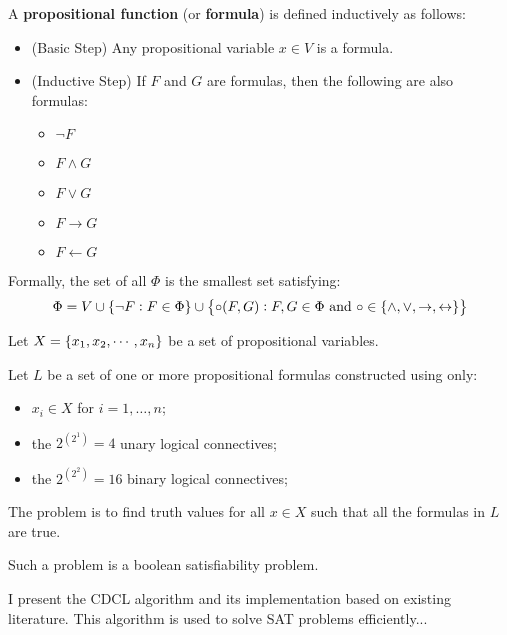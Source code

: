 \begin{tcolorbox}[colframe=defcolor,title={\color{white}\bf Propositional Function (Formula)}]
\begin{definition}
A \textbf{propositional function} (or \textbf{formula}) is defined inductively as follows:
\begin{itemize}
	\item[] (Basic Step) Any propositional variable $x\in V$ is a formula.
	\item[] (Inductive Step) If $F$ and $G$ are formulas, then the following are also formulas:
	\begin{itemize}
		\item $\lnot F$
		\item $F\land G$
		\item $F\lor G$
		\item $F\rightarrow G$
		\item $F\leftarrow G$
	\end{itemize}
\end{itemize}
Formally, the set of all $\Phi$ is the smallest set satisfying: \[
\Phi = V\cup\set{\lnot F:F\in\Phi}\cup\set{\circ(F,G):F,G\in\Phi\ \text{and}\ \circ\in\set{\land,\lor,\rightarrow,\leftrightarrow}}
\]
\end{definition}
\end{tcolorbox}

\begin{tcolorbox}[colframe=defcolor,title={\color{white}\bf Boolean Satisfiability Problem (SAT)}]
\begin{definition}
Let $X=\set{x_1,x_2,\cdots, x_n}$ be a set of propositional variables.

Let $L$ be a set of one or more propositional formulas constructed using only:
\begin{itemize}
	\item $x_i\in X$ for $i=1,\dots,n$;
	\item the $2^{(2^1)}=4$ unary logical connectives;
	\item the $2^{(2^2)}=16$ binary logical connectives;
\end{itemize}
The problem is to find truth values for all $x\in X$
such that all the formulas in $L$ are true.

Such a problem is a boolean satisfiability problem.
\end{definition}
\end{tcolorbox}

	I present the CDCL algorithm and its implementation based on existing literature. This algorithm is used to solve SAT problems efficiently...

